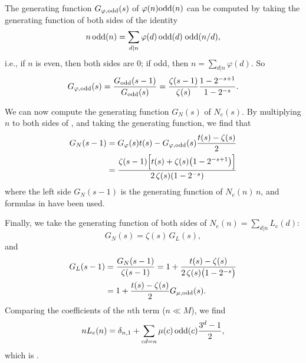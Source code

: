 \documentclass[twocolumn]{revtex4-1}
\begin{document}
The generating function $G_{\varphi,\mathrm{odd}}(s)$
of $\varphi(n) \mathrm{odd}(n)$ can be computed by taking the generating function
of both sides of the identity
\[
  n \, \mathrm{odd}(n)  = \sum_{d|n} \varphi(d) \, \mathrm{odd}(d) \; \mathrm{odd}(n/d),
\]
i.e., if $n$ is even, then both sides are 0;
if odd, then $n = \sum_{d|n} \varphi(d)$.
So
\[
  G_{\varphi,\mathrm{odd}}(s) = \frac{G_{\mathrm{odd}}(s-1)}{G_{\mathrm{odd}}(s)}
  = \frac{\zeta(s-1)}{\zeta(s)} \frac{1 - 2^{-s + 1}}{1 - 2^{-s}}.
\]


We can now compute the generating function $G_N(s)$ of $N_e(s)$.
By multiplying $n$ to both sides of ,
and taking the generating function,
we find that
\begin{align*}
  G_N(s - 1)
    &= G_\varphi(s) t(s)- G_{\varphi, \mathrm{odd}}(s) \frac{t(s)-\zeta(s)}{2} \\
    &=
      \frac{\zeta(s-1) \Big[ t(s) + \zeta(s) \big( 1  - 2^{-s+1} \big) \Big]  }
           {2 \, \zeta(s) (1 - 2^{-s}) }
\end{align*}
where the left side $G_N(s-1)$ is
  the generating function of $N_e(n) \, n$,
and formulas in  have been used.

Finally, we take the generating function of both sides of
 $N_e(n) = \sum_{d|n} L_e(d)$:
\[
  G_N(s) = \zeta(s) \, G_L(s),
\]
and
\begin{align*}
  G_L(s-1)
  & = \frac{G_N(s - 1)}{\zeta(s-1)}
  = 1
        + \frac{ t(s) - \zeta(s) }
          {2 \, \zeta(s) \big(1 - 2^{-s}\big)} \\
  &   = 1 + \frac{t(s) - \zeta(s)}{2} G_{\mu, \mathrm{odd}}(s).
\end{align*}
Comparing the coefficients of the $n$th term ($n \ll M$),
  we find
\[
  n L_e(n) = \delta_{n,1} + \sum_{cd = n} \mu(c) \, \mathrm{odd}(c) \frac{3^d-1}{2},
\]
which is 
\big[also note $\delta_{n,1} = \sum_{c|n}\mu(c)$\big].
\end{document}
